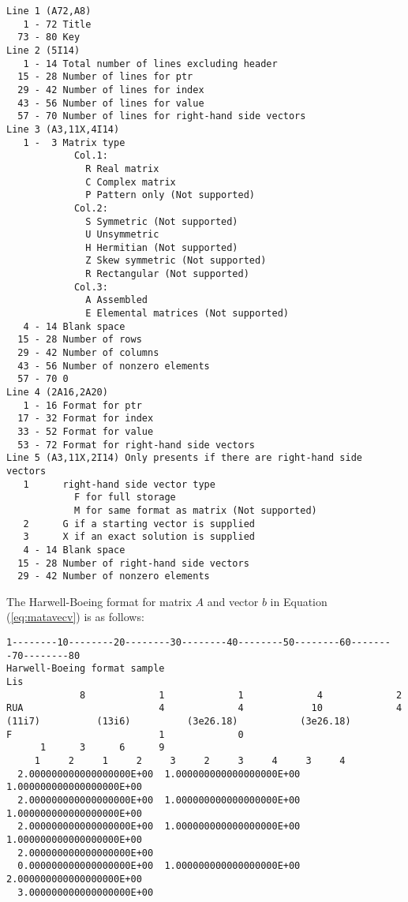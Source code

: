 \documentclass[a4paper]{article}
\begin{document}
{\small
\begin{verbatim}
Line 1 (A72,A8)
   1 - 72 Title
  73 - 80 Key
Line 2 (5I14)
   1 - 14 Total number of lines excluding header 
  15 - 28 Number of lines for ptr
  29 - 42 Number of lines for index
  43 - 56 Number of lines for value
  57 - 70 Number of lines for right-hand side vectors
Line 3 (A3,11X,4I14)
   1 -  3 Matrix type 
            Col.1: 
              R Real matrix
              C Complex matrix
              P Pattern only (Not supported)
            Col.2: 
              S Symmetric (Not supported)
              U Unsymmetric
              H Hermitian (Not supported)
              Z Skew symmetric (Not supported)
              R Rectangular (Not supported)
            Col.3: 
              A Assembled
              E Elemental matrices (Not supported)
   4 - 14 Blank space
  15 - 28 Number of rows
  29 - 42 Number of columns 
  43 - 56 Number of nonzero elements
  57 - 70 0
Line 4 (2A16,2A20)
   1 - 16 Format for ptr
  17 - 32 Format for index
  33 - 52 Format for value
  53 - 72 Format for right-hand side vectors
Line 5 (A3,11X,2I14) Only presents if there are right-hand side vectors
   1      right-hand side vector type
            F for full storage
            M for same format as matrix (Not supported)
   2      G if a starting vector is supplied
   3      X if an exact solution is supplied
   4 - 14 Blank space
  15 - 28 Number of right-hand side vectors 
  29 - 42 Number of nonzero elements
\end{verbatim}
}

The Harwell-Boeing format for matrix $A$ and vector $b$ in Equation (\ref{eq:matavecv}) is as follows: 

{\small
\begin{verbatim}
1--------10--------20--------30--------40--------50--------60--------70--------80
Harwell-Boeing format sample                                            Lis
             8             1             1             4             2
RUA                        4             4            10             4
(11i7)          (13i6)          (3e26.18)           (3e26.18)
F                          1             0
      1      3      6      9
     1     2     1     2     3     2     3     4     3     4
  2.000000000000000000E+00  1.000000000000000000E+00  1.000000000000000000E+00
  2.000000000000000000E+00  1.000000000000000000E+00  1.000000000000000000E+00
  2.000000000000000000E+00  1.000000000000000000E+00  1.000000000000000000E+00
  2.000000000000000000E+00
  0.000000000000000000E+00  1.000000000000000000E+00  2.000000000000000000E+00
  3.000000000000000000E+00
\end{verbatim}
}
\end{document}
